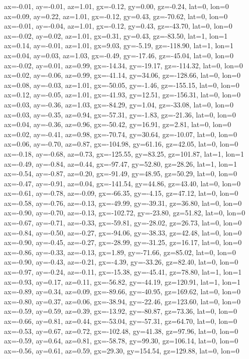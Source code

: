 ax=-0.01, ay=-0.01, az=1.01, gx=-0.12, gy=0.00, gz=-0.24, lat=0, lon=0
ax=0.09, ay=0.22, az=1.01, gx=-0.12, gy=0.43, gz=-70.62, lat=0, lon=0
ax=-0.01, ay=-0.04, az=1.01, gx=-0.12, gy=0.43, gz=-43.70, lat=0, lon=0
ax=-0.02, ay=0.02, az=1.01, gx=0.31, gy=0.43, gz=-83.50, lat=1, lon=1
ax=0.14, ay=-0.01, az=1.01, gx=9.03, gy=-5.19, gz=-118.90, lat=1, lon=1
ax=0.04, ay=0.03, az=1.03, gx=-0.49, gy=-17.46, gz=-45.04, lat=0, lon=0
ax=-0.02, ay=0.01, az=0.99, gx=-14.34, gy=-19.17, gz=-114.32, lat=0, lon=0
ax=0.02, ay=-0.06, az=0.99, gx=-41.14, gy=34.06, gz=-128.66, lat=0, lon=0
ax=0.08, ay=-0.03, az=1.01, gx=-50.05, gy=-1.46, gz=-155.15, lat=0, lon=0
ax=0.12, ay=-0.05, az=1.01, gx=-41.93, gy=12.51, gz=-156.31, lat=0, lon=0
ax=0.03, ay=-0.36, az=1.03, gx=-84.29, gy=1.04, gz=-33.08, lat=0, lon=0
ax=0.03, ay=-0.35, az=0.94, gx=-57.31, gy=-1.83, gz=-21.36, lat=0, lon=0
ax=0.04, ay=-0.36, az=0.96, gx=-50.42, gy=16.91, gz=2.81, lat=0, lon=0
ax=0.02, ay=-0.41, az=0.98, gx=-70.74, gy=30.64, gz=-10.07, lat=0, lon=0
ax=0.06, ay=-0.70, az=0.87, gx=-104.98, gy=61.16, gz=42.05, lat=0, lon=0
ax=-0.18, ay=-0.68, az=0.73, gx=-125.55, gy=83.25, gz=101.87, lat=1, lon=1
ax=-0.49, ay=-0.84, az=0.44, gx=-97.47, gy=52.80, gz=28.26, lat=1, lon=1
ax=-0.54, ay=-0.87, az=0.20, gx=-91.49, gy=48.95, gz=50.29, lat=0, lon=0
ax=-0.47, ay=-0.91, az=0.04, gx=-141.54, gy=44.86, gz=43.40, lat=0, lon=0
ax=-0.61, ay=-0.78, az=-0.09, gx=-66.35, gy=-4.15, gz=47.12, lat=0, lon=0
ax=-0.58, ay=-0.76, az=-0.13, gx=-49.99, gy=-39.31, gz=36.80, lat=0, lon=0
ax=-0.90, ay=-0.70, az=-0.13, gx=-102.72, gy=-23.80, gz=51.82, lat=0, lon=0
ax=-0.67, ay=-0.71, az=-0.33, gx=-59.81, gy=-28.02, gz=26.73, lat=0, lon=0
ax=-0.84, ay=-0.50, az=-0.27, gx=-94.06, gy=-38.33, gz=42.48, lat=0, lon=0
ax=-0.90, ay=-0.45, az=-0.27, gx=-28.99, gy=-31.25, gz=16.17, lat=0, lon=0
ax=-0.86, ay=-0.33, az=-0.13, gx=1.89, gy=-71.66, gz=85.02, lat=0, lon=0
ax=-0.90, ay=-0.43, az=-0.21, gx=-4.39, gy=-33.26, gz=82.40, lat=0, lon=0
ax=-0.97, ay=-0.24, az=-0.11, gx=-15.38, gy=-45.41, gz=78.80, lat=1, lon=1
ax=-0.93, ay=0.17, az=0.11, gx=-56.82, gy=-44.19, gz=120.91, lat=1, lon=1
ax=-0.89, ay=0.34, az=0.09, gx=-89.66, gy=-40.95, gz=169.62, lat=0, lon=0
ax=-0.80, ay=0.37, az=0.06, gx=-38.94, gy=-22.46, gz=123.60, lat=0, lon=0
ax=-0.59, ay=0.59, az=0.39, gx=-13.92, gy=-80.87, gz=73.36, lat=0, lon=0
ax=-0.66, ay=0.81, az=0.44, gx=-53.04, gy=-57.31, gz=64.70, lat=0, lon=0
ax=-0.53, ay=0.67, az=0.72, gx=-102.48, gy=41.38, gz=97.96, lat=0, lon=0
ax=-0.59, ay=0.64, az=0.81, gx=-58.78, gy=99.30, gz=106.14, lat=0, lon=0
ax=-0.56, ay=0.61, az=0.59, gx=29.30, gy=154.54, gz=129.88, lat=0, lon=0
